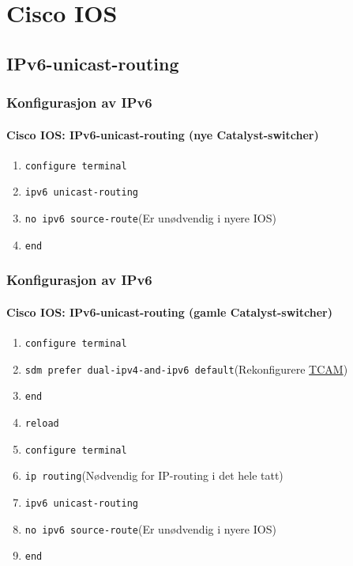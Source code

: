 \section{Cisco IOS}
\subsection{IPv6-unicast-routing}
\begin{frame}
  \frametitle{Konfigurasjon av IPv6}
  \framesubtitle{Cisco IOS: IPv6-unicast-routing (nye Catalyst-switcher)}
  \begin{enumerate}
  \item \texttt{configure terminal}
  \item \alert{\texttt{ipv6 unicast-routing}}
  \item \texttt{no ipv6 source-route}\hfill(Er unødvendig i nyere IOS)
  \item \texttt{end}
  \end{enumerate}
\end{frame}

\begin{frame}
  \frametitle{Konfigurasjon av IPv6}
  \framesubtitle{Cisco IOS: IPv6-unicast-routing (gamle Catalyst-switcher)}
  \begin{enumerate}
  \item \texttt{configure terminal}
  \item \alert{\texttt{sdm prefer dual-ipv4-and-ipv6 default}}\hfill(Rekonfigurere \href{http://en.wikipedia.org/wiki/Content-addressable_memory}{TCAM})
  \item \texttt{end}
  \item \texttt{reload}
  \item \texttt{configure terminal}
  \item \alert{\texttt{ip routing}}\hfill(Nødvendig for IP-routing i det hele tatt)
  \item \alert{\texttt{ipv6 unicast-routing}}
  \item \texttt{no ipv6 source-route}\hfill(Er unødvendig i nyere IOS)
  \item \texttt{end}
  \end{enumerate}
\end{frame}

